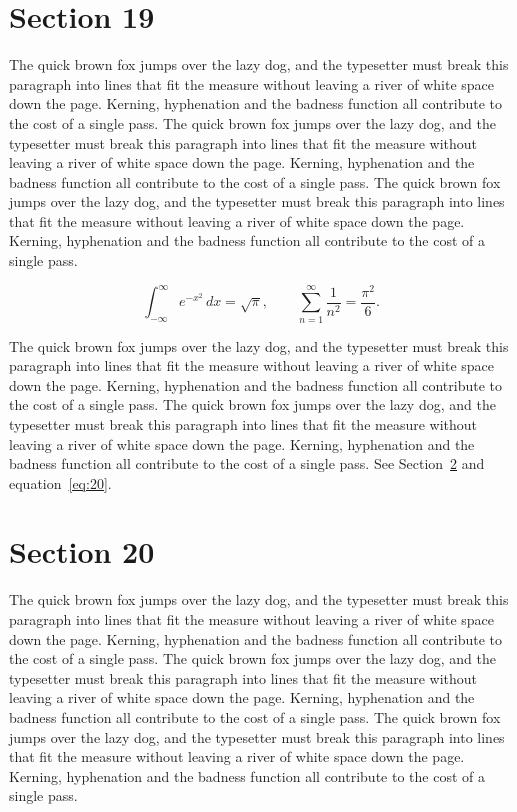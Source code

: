 \documentclass{article}
\begin{document}
\section{Section 19}
\label{sec:19}
The quick brown fox jumps over the lazy dog, and the typesetter must break this paragraph into lines that fit the measure without leaving a river of white space down the page. Kerning, hyphenation and the badness function all contribute to the cost of a single pass. The quick brown fox jumps over the lazy dog, and the typesetter must break this paragraph into lines that fit the measure without leaving a river of white space down the page. Kerning, hyphenation and the badness function all contribute to the cost of a single pass. The quick brown fox jumps over the lazy dog, and the typesetter must break this paragraph into lines that fit the measure without leaving a river of white space down the page. Kerning, hyphenation and the badness function all contribute to the cost of a single pass. 

\begin{equation}\label{eq:19}
\int_{-\infty}^{\infty} e^{-x^{2}}\,dx = \sqrt{\pi}, \qquad
\sum_{n=1}^{\infty} \frac{1}{n^{2}} = \frac{\pi^{2}}{6}.
\end{equation}

The quick brown fox jumps over the lazy dog, and the typesetter must break this paragraph into lines that fit the measure without leaving a river of white space down the page. Kerning, hyphenation and the badness function all contribute to the cost of a single pass. The quick brown fox jumps over the lazy dog, and the typesetter must break this paragraph into lines that fit the measure without leaving a river of white space down the page. Kerning, hyphenation and the badness function all contribute to the cost of a single pass. 
See Section~\ref{sec:20} and equation~\eqref{eq:20}.
\section{Section 20}
\label{sec:20}
The quick brown fox jumps over the lazy dog, and the typesetter must break this paragraph into lines that fit the measure without leaving a river of white space down the page. Kerning, hyphenation and the badness function all contribute to the cost of a single pass. The quick brown fox jumps over the lazy dog, and the typesetter must break this paragraph into lines that fit the measure without leaving a river of white space down the page. Kerning, hyphenation and the badness function all contribute to the cost of a single pass. The quick brown fox jumps over the lazy dog, and the typesetter must break this paragraph into lines that fit the measure without leaving a river of white space down the page. Kerning, hyphenation and the badness function all contribute to the cost of a single pass. 
\end{document}
